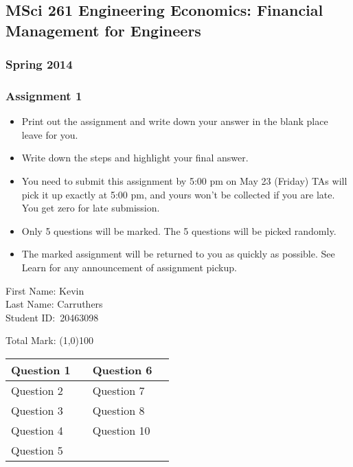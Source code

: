 \documentclass[12pt]{article}
\begin{document}
\begin{centering}
\subsection*{MSci 261 Engineering Economics: Financial Management for Engineers}
\subsubsection*{Spring 2014}
\subsubsection*{Assignment 1}
\end{centering}

\begin{itemize}
\item Print out the assignment and write down your answer in the blank place leave for you.
\item Write down the steps and highlight your final answer.
\item You need to submit this assignment by 5:00 pm on May 23 (Friday) TAs will pick it up exactly at 5:00 pm, and yours won’t be collected if you are late. You get zero for late submission.
\item Only 5 questions will be marked. The 5 questions will be picked randomly.
\item The marked assignment will be returned to you as quickly as possible. See Learn for any announcement of assignment pickup.
\end{itemize}

First Name: Kevin\\
Last Name: Carruthers\\
Student ID:\ 20463098

\vspace{40pt}

Total Mark: \line(1,0){100}

\begin{center}
\begin{tabular}{| p{3cm}| p{3cm}| p{3cm}| p{3cm}|}
  \hline
  Question 1 & & Question 6  &  \\[1cm]
  \hline
  Question 2 & & Question 7  &  \\[1cm]
  \hline
  Question 3 & & Question 8  &  \\[1cm]
  \hline
  Question 4 & & Question 10 &  \\[1cm]
  \hline
  Question 5 & &  &  \\[1cm]
\hline
\end{tabular}
\end{center}
\newpage
\end{document}
